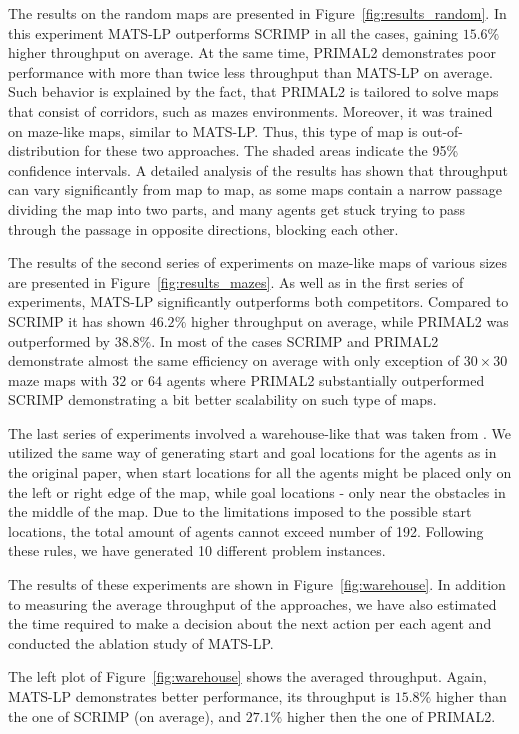 \documentclass[letterpaper]{article} %
\begin{document}
The results on the random maps are presented in Figure~\ref{fig:results_random}. 
In this experiment MATS-LP outperforms SCRIMP in all the cases, gaining $15.6\%$ higher throughput on average. At the same time, PRIMAL2 demonstrates poor performance with more than twice less throughput than MATS-LP on average. Such behavior is explained by the fact, that PRIMAL2 is tailored to solve maps that consist of corridors, such as mazes environments. Moreover, it was trained on maze-like maps, similar to MATS-LP. Thus, this type of map is out-of-distribution for these two approaches.
The shaded areas indicate the 95\% confidence intervals. A detailed analysis of the results has shown that throughput can vary significantly from map to map, as some maps contain a narrow passage dividing the map into two parts, and many agents get stuck trying to pass through the passage in opposite directions, blocking each other.




The results of the second series of experiments on maze-like maps of various sizes are presented in Figure~\ref{fig:results_mazes}. As well as in the first series of experiments, MATS-LP significantly outperforms both competitors. Compared to SCRIMP it has shown $46.2\%$ higher throughput on average, while PRIMAL2 was outperformed by $38.8\%$. 
In most of the cases SCRIMP and PRIMAL2 demonstrate almost the same efficiency on average with only exception of $30\times30$ maze maps with $32$ or $64$ agents where PRIMAL2 substantially outperformed SCRIMP demonstrating a bit better scalability on such type of maps.


The last series of experiments involved a warehouse-like that was taken from \cite{li2021lifelong}. We utilized the same way of generating start and goal locations for the agents as in the original paper, when start locations for all the agents might be placed only on the left or right edge of the map, while goal locations - only near the obstacles in the middle of the map. Due to the limitations imposed to the possible start locations, the total amount of agents cannot exceed number of 192. Following these rules, we have generated 10 different problem instances.

The results of these experiments are shown in Figure~\ref{fig:warehouse}. In addition to measuring the average throughput of the approaches, we have also estimated the time required to make a decision about the next action per each agent and conducted the ablation study of MATS-LP. 

The left plot of Figure~\ref{fig:warehouse} shows the averaged throughput. Again, MATS-LP demonstrates better performance, its throughput is $15.8\%$ higher than the one of SCRIMP (on average), and $27.1\%$ higher then the one of PRIMAL2.
\end{document}
